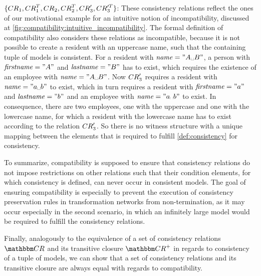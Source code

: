 \begin{example}
\begin{properdescription}
\item[$\setted{\consistencyrelation{CR}{1}, \consistencyrelation{CR}{1}^T, \consistencyrelation{CR}{2}, \consistencyrelation{CR}{2}^T, \consistencyrelation{CR}{3}', \consistencyrelation{CR}{3}'^T}$:]
These consistency relations reflect the ones of our motivational example for an intuitive notion of incompatibility, discussed at \autoref{fig:compatibility:intuitive_incompatibility}.
The formal definition of compatibility also considers these relations as incompatible, because it is not possible to create a resident with an uppercase name, such that the containing tuple of models is consistent.
For a resident with $\mathvariable{name} = "A\text{\textvisiblespace}B"$, a person with $\mathit{firstname} = "A"$ and $\mathit{lastname} = "B"$ has to exist, which requires the existence of an employee with $\mathvariable{name} = "A\text{\textvisiblespace}B"$. Now $\consistencyrelation{CR}{3}'$ requires a resident with $\mathvariable{name} = "a\text{\textvisiblespace}b"$ to exist, which in turn requires a resident with $\mathit{firstname} = "a"$ and $\mathit{lastname} = "b"$ and an employee with $\mathvariable{name} = "a\text{\textvisiblespace}b"$ to exist.
In consequence, there are two employees, one with the uppercase and one with the lowercase name, for which a resident with the lowercase name has to exist according to the relation $\consistencyrelation{CR}{3}'$. So there is no witness structure with a unique mapping between the elements that is required to fulfill \autoref{def:consistency} for consistency.
\end{properdescription}
\end{example}

To summarize, compatibility is supposed to ensure that consistency relations do not impose restrictions on other relations such that their condition elements, for which consistency is defined, can never occur in consistent models.
The goal of ensuring compatibility is especially to prevent the execution of consistency preservation rules in transformation networks from non-termination, as it may occur especially in the second scenario, in which an infinitely large model would be required to fulfill the consistency relations.

Finally, analogously to the equivalence of a set of consistency relations $\consistencyrelationset{CR}$ and its transitive closure $\transitiveclosure{\consistencyrelationset{CR}}$ in regards to consistency of a tuple of models, we can show that a set of consistency relations and its transitive closure are always equal with regards to compatibility.

